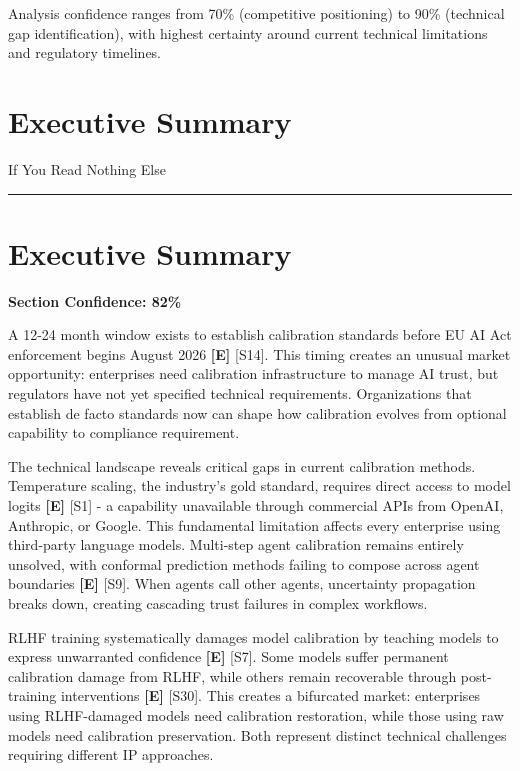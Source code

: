 \documentclass[a4paper,11pt]{article}
\newcommand{\ssubtitle}[1]{%
  \par\textcolor{subtitle}{\fontsize{12}{16}\selectfont #1}%
  \par\vspace{2pt}\textcolor{border}{\rule{\linewidth}{0.4pt}}\vspace{12pt}%
}
\newcommand{\elabel}{\textbf{\textcolor{ecolor}{[E]}}}
\begin{document}
Analysis confidence ranges from 70\% (competitive positioning) to 90\% (technical gap identification), with highest certainty around current technical limitations and regulatory timelines.

\clearpage
\section{Executive Summary}
\ssubtitle{If You Read Nothing Else}

\section{Executive Summary}

\textbf{Section Confidence: 82\%}\par

A 12-24 month window exists to establish calibration standards before EU AI Act enforcement begins August 2026 \elabel{} \textcolor{primary}{[S14]}. This timing creates an unusual market opportunity: enterprises need calibration infrastructure to manage AI trust, but regulators have not yet specified technical requirements. Organizations that establish de facto standards now can shape how calibration evolves from optional capability to compliance requirement.


The technical landscape reveals critical gaps in current calibration methods. Temperature scaling, the industry's gold standard, requires direct access to model logits \elabel{} \textcolor{primary}{[S1]} - a capability unavailable through commercial APIs from OpenAI, Anthropic, or Google. This fundamental limitation affects every enterprise using third-party language models. Multi-step agent calibration remains entirely unsolved, with conformal prediction methods failing to compose across agent boundaries \elabel{} \textcolor{primary}{[S9]}. When agents call other agents, uncertainty propagation breaks down, creating cascading trust failures in complex workflows.


RLHF training systematically damages model calibration by teaching models to express unwarranted confidence \elabel{} \textcolor{primary}{[S7]}. Some models suffer permanent calibration damage from RLHF, while others remain recoverable through post-training interventions \elabel{} \textcolor{primary}{[S30]}. This creates a bifurcated market: enterprises using RLHF-damaged models need calibration restoration, while those using raw models need calibration preservation. Both represent distinct technical challenges requiring different IP approaches.
\end{document}
